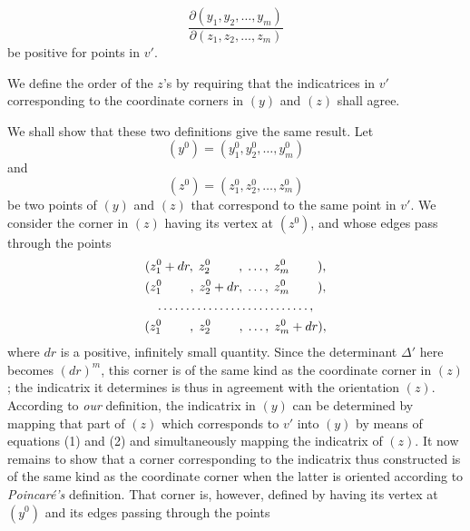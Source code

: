 \documentclass{article}
\begin{document}
\[
\frac{\partial(y_1, y_2, \dots, y_m)}{\partial(z_1, z_2, \dots, z_m)}
\]
be positive for points in $v'$.

We define the order of the $z$'s by requiring that the indicatrices in $v'$ corresponding to the coordinate corners in $(y)$ and $(z)$ shall agree.

We shall show that these two definitions give the same result. Let
\[
(y^0) = (y_1^0, y_2^0, \dots, y_m^0)
\]
and
\[
(z^0) = (z_1^0, z_2^0, \dots, z_m^0)
\]
be two points of $(y)$ and $(z)$ that correspond to the same point in $v'$. We consider the corner in $(z)$ having its vertex at $(z^0)$, and whose edges pass through the points
\[
\begin{gathered}
(z_1^0 + dr, \; z_2^0 \hphantom{{} + dr}, \; \dots, \; z_m^0 \hphantom{{} + dr}), \\
(z_1^0 \hphantom{{} + dr}, \; z_2^0 + dr, \; \dots, \; z_m^0 \hphantom{{} + dr}), \\
\dots\dots\dots\dots\dots\dots\dots\dots\dots, \\
(z_1^0 \hphantom{{} + dr}, \; z_2^0 \hphantom{{} + dr}, \; \dots, \; z_m^0 + dr),
\end{gathered}
\]
where $dr$ is a positive, infinitely small quantity. Since the determinant $\Delta'$ here becomes $(dr)^m$, this corner is of the same kind as the coordinate corner in $(z)$; the indicatrix it determines is thus in agreement with the orientation $(z)$. According to \emph{our} definition, the indicatrix in $(y)$ can be determined by mapping that part of $(z)$ which corresponds to $v'$ into $(y)$ by means of equations (1) and (2) and simultaneously mapping the indicatrix of $(z)$. It now remains to show that a corner corresponding to the indicatrix thus constructed is of the same kind as the coordinate corner when the latter is oriented according to \emph{Poincaré's} definition. That corner is, however, defined by having its vertex at $(y^0)$ and its edges passing through the points
\end{document}
